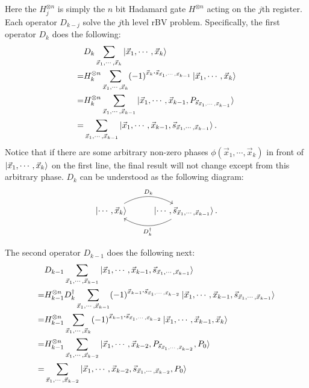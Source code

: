 \documentclass{article}
\begin{document}
Here the $H^{\otimes n}_j$ is simply the $n$ bit Hadamard gate $H^{\otimes n}$ acting
on the $j$th register. Each operator $D_{k-j}$ solve the $j$th level rBV
problem. Specifically, the first operator $D_k$ does the following:
\begin{align}
  & D_k \sum_{\vec{x}_1,\cdots,\vec{x}_k} \ket{\vec{x}_1,\cdots,\vec{x}_k}\nonumber\\ 
  = & H^{\otimes n}_k \sum_{\vec{x}_1,\cdots,\vec{x}_k}
  (-1)^{\vec{x}_k\vdot\vec{s}_{\vec{x}_1,\cdots,\vec{x}_{k-1}}} 
  \ket{\vec{x}_1,\cdots,\vec{x}_k} \\
  = & H_k^{\otimes n} \sum_{\vec{x}_1,\cdots,\vec{x}_{k-1}}
  \ket{\vec{x}_1,\cdots,\vec{x}_{k-1},P_{\vec{s}_{\vec{x}_1,\cdots,\vec{x}_{k-1}}}}
  \\
  = & \sum_{\vec{x}_1,\cdots,\vec{x}_{k-1}}
  \ket{\vec{x}_1,\cdots,\vec{x}_{k-1},\vec{s}_{\vec{x}_1,\cdots,\vec{x}_{k-1}}}.
\end{align}
Notice that if there are some arbitrary non-zero phases
$\phi(\vec{x}_1,\cdots,\vec{x}_k)$ in front of
$\ket{\vec{x}_1,\cdots,\vec{x}_k}$ on the first line, the final result will not
change except from this arbitrary phase. $D_k$ can be understood as the following
diagram:
\begin{equation}
\begin{tikzcd}
  \ket{\cdots,\vec{x}_k} \arrow[r, bend left, "D_k"] & 
   \arrow[l, bend left, "D^\dagger_k"] 
   \ket{\cdots,\vec{s}_{\vec{x}_1,\cdots,\vec{x}_{k-1}}}.
\end{tikzcd}
\end{equation}

The second operator $D_{k-1}$ does the following next:
\begin{align}
  & D_{k-1} \sum_{\vec{x}_1,\cdots,\vec{x}_{k-1}}
  \ket{\vec{x}_1,\cdots,\vec{x}_{k-1},\vec{s}_{\vec{x}_1,\cdots,\vec{x}_{k-1}}}
  \\
  =& H^{\otimes n}_{k-1} D^\dagger_k \sum_{\vec{x}_1,\cdots,\vec{x}_{k-1}} 
  (-1)^{\vec{x}_{k-1}\vdot \vec{s}_{\vec{x}_1,\cdots,\vec{x}_{k-2}}}
  \ket{\vec{x}_1,\cdots,\vec{x}_{k-1},\vec{s}_{\vec{x}_1,\cdots,\vec{x}_{k-1}}}
  \\
  =& H^{\otimes n}_{k-1} \sum_{\vec{x}_1,\cdots,\vec{x}_{k}}
  (-1)^{\vec{x}_{k-1}\vdot \vec{s}_{\vec{x}_1,\cdots,\vec{x}_{k-2}}}
  \ket{\vec{x}_1,\cdots,\vec{x}_{k-1},\vec{x}_{k}}
  \\
  =& H^{\otimes n}_{k-1} \sum_{\vec{x}_1,\cdots,\vec{x}_{k-2}}
  \ket{\vec{x}_1,\cdots,\vec{x}_{k-2},
  P_{\vec{s}_{\vec{x}_1,\cdots,\vec{x}_{k-2}}},P_0}
  \\
  =& \sum_{\vec{x}_1,\cdots,\vec{x}_{k-2}}
  \ket{\vec{x}_1,\cdots,\vec{x}_{k-2}, \vec{s}_{\vec{x}_1,\cdots,\vec{x}_{k-2}},P_0}
\end{align}
\end{document}
